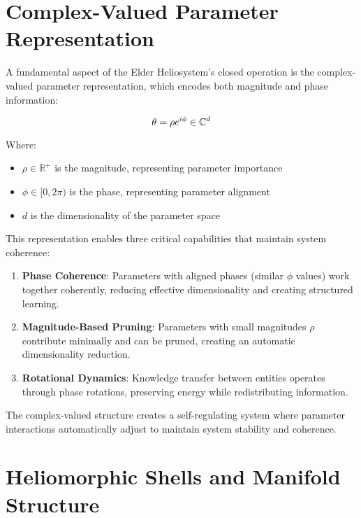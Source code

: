 \section{Complex-Valued Parameter Representation}

A fundamental aspect of the Elder Heliosystem's closed operation is the complex-valued parameter representation, which encodes both magnitude and phase information:

\begin{equation}
\theta = \rho e^{i\phi} \in \mathbb{C}^{d}
\end{equation}

Where:
\begin{itemize}
    \item $\rho \in \mathbb{R}^+$ is the magnitude, representing parameter importance
    \item $\phi \in [0, 2\pi)$ is the phase, representing parameter alignment
    \item $d$ is the dimensionality of the parameter space
\end{itemize}

This representation enables three critical capabilities that maintain system coherence:

\begin{enumerate}
    \item \textbf{Phase Coherence}: Parameters with aligned phases (similar $\phi$ values) work together coherently, reducing effective dimensionality and creating structured learning.
    
    \item \textbf{Magnitude-Based Pruning}: Parameters with small magnitudes $\rho$ contribute minimally and can be pruned, creating an automatic dimensionality reduction.
    
    \item \textbf{Rotational Dynamics}: Knowledge transfer between entities operates through phase rotations, preserving energy while redistributing information.
\end{enumerate}

The complex-valued structure creates a self-regulating system where parameter interactions automatically adjust to maintain system stability and coherence.

\section{Heliomorphic Shells and Manifold Structure}

